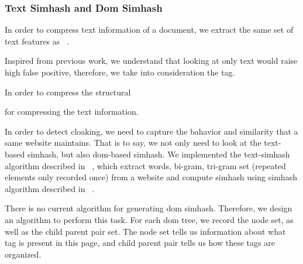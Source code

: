 \subsubsection{Text Simhash and Dom Simhash}


In order to compress text information of a document, we extract the same set of
text features as ~\cite{manku2007detecting}.

Inspired from previous work, we understand that looking at only text would raise
high false positive, therefore, we take into consideration the tag.

In order to compress the structural 

for compressing
the text information. 



In order to detect cloaking, we need to capture the bahavior and similarity that
a same website maintains. That is to say, we not only need to look at the text-based simhash,
but also dom-based simhash. We implemented the text-simhash algorithm described
in ~\cite{manku2007detecting}, which extract words, bi-gram, tri-gram set
(repeated elements only recorded once) from a website and compute simhash using
simhash algorithm described in ~\cite{charikar2002similarity}.

There is no current algorithm for generating dom simhash. Therefore, we design
an algorithm to perform this task. For each dom tree, we record the node set, as
well as the child parent pair set. The node set tells us information about what
tag is present in this page, and child parent pair tells us how these tags are
organized.

